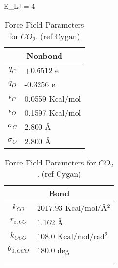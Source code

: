 \documentclass[twoside,english]{uiofysmaster}
\begin{document}
\beq
E_{LJ} = 4\epsilon \Big[ \Big( \frac{\sigma}}{r_{ij}} \Big) ^{12} - 2\Big( \frac{\sigma}{r_{ij}} \Big) ^{6} \Big]
\eeq


\begin{table}
 \caption{Force Field Parameters for $CO_2$. (ref Cygan)}
 \begin{tabular}[]{|c|l|}
  \hline
  \multicolumn{2}{|c|}{Nonbond} \\ \hline
  $q_C$ & +0.6512 e  \\ \hline
  $q_O$ & -0.3256 e  \\ \hline
  $\epsilon _C$ & 0.0559 Kcal/mol \\ \hline
  $\epsilon _O$ & 0.1597 Kcal/mol \\ \hline
  $\sigma _C$ & 2.800 \AA{} \\ \hline
  $\sigma _O$ & 2.800 \AA{} \\ \hline
 \end{tabular}
  \begin{tabular}[]{|c|l|}
  \hline
  \multicolumn{2}{|c|}{Bond} \\ \hline
  $k_{CO}$ & 2017.93 Kcal/mol/\AA{}$^2$  \\ \hline
  $r_{o,CO}$ & 1.162 \AA{}  \\ \hline
  $k_{OCO}$ & 108.0 Kcal/mol/rad$^2$ \\ \hline
  $\theta _{0,OCO}$ & 180.0 deg \\ \hline
                    &           \\ \hline
                    &           \\ \hline

 \end{tabular}
 \label{table:ForceFieldParameters_CO2}
\end{table}
\end{document}
